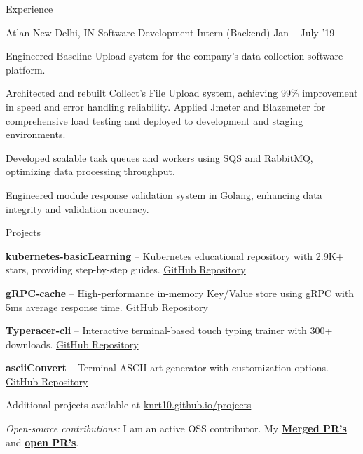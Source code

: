 \documentclass{resume} %
\begin{document}
\begin{rSection}{Experience}
  \begin{rWorkSection}{Atlan}
                     {New Delhi, IN}
                     {Software Development Intern (Backend)}
                     {Jan -- July '19}
  {
    \item Engineered Baseline Upload system for the company's data collection software platform.
    \item Architected and rebuilt Collect's File Upload system, achieving 99\% improvement in speed and error handling reliability. Applied Jmeter and Blazemeter for comprehensive load testing and deployed to development and staging environments.
    \item Developed scalable task queues and workers using SQS and RabbitMQ, optimizing data processing throughput.
    \item Engineered module response validation system in Golang, enhancing data integrity and validation accuracy.
  }
  \end{rWorkSection}
\end{rSection}


\begin{rSection}{Projects}
\vspace{0.05cm}
  \begin{rProjectSection}
    \item \textbf{kubernetes-basicLearning} -- Kubernetes educational repository with 2.9K+ stars, providing step-by-step guides. \href{https://github.com/knrt10/kubernetes-basicLearning/}{GitHub Repository}
    \item \textbf{gRPC-cache} -- High-performance in-memory Key/Value store using gRPC with 5ms average response time. \href{https://github.com/knrt10/gRPC-cache}{GitHub Repository}
    \item \textbf{Typeracer-cli} -- Interactive terminal-based touch typing trainer with 300+ downloads. \href{https://github.com/p-society/typeracer-cli/}{GitHub Repository}
    \item \textbf{asciiConvert} -- Terminal ASCII art generator with customization options. \href{https://github.com/knrt10/asciiConvert/}{GitHub Repository}
    \item Additional projects available at \href{https://knrt10.github.io/projects/}{knrt10.github.io/projects}
  \end{rProjectSection}

  \begin{rBlurbSection}
    \item {\em Open-source contributions:}
      I am an active OSS contributor. My \href{http://bit.ly/2kdr9Ui}{\textbf{Merged PR's}} and \href{http://bit.ly/2kxjvV9}{\textbf{open PR's}}.
  \end{rBlurbSection}
\end{rSection}
\end{document}
